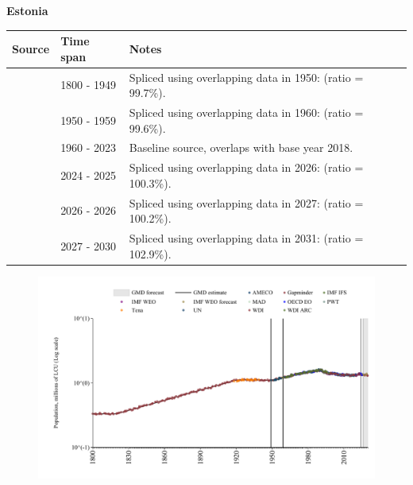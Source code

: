 \documentclass[12pt,a4paper,landscape]{article}
\begin{document}
\begin{adjustbox}{max totalsize={\paperwidth}{\paperheight},center}
\begin{minipage}[t][\textheight][t]{\textwidth}
\vspace*{0.5cm}
{}
\begin{center}
{\Large\bfseries Estonia}
\end{center}
\vspace{0.5cm}
\begin{table}[H]
\centering
\small
\begin{tabular}{|l|l|l|}
\hline
\textbf{Source} & \textbf{Time span} & \textbf{Notes} \\
\hline
\rowcolor{white}\cite{Gapminder}& 1800 - 1949 &Spliced using overlapping data in 1950: (ratio = 99.7\%).\\
\rowcolor{lightgray}\cite{IMF_IFS}& 1950 - 1959 &Spliced using overlapping data in 1960: (ratio = 99.6\%).\\
\rowcolor{white}\cite{WDI}& 1960 - 2023 &Baseline source, overlaps with base year 2018.\\
\rowcolor{lightgray}\cite{OECD_EO}& 2024 - 2025 &Spliced using overlapping data in 2026: (ratio = 100.3\%).\\
\rowcolor{white}\cite{AMECO}& 2026 - 2026 &Spliced using overlapping data in 2027: (ratio = 100.2\%).\\
\rowcolor{lightgray}\cite{Gapminder}& 2027 - 2030 &Spliced using overlapping data in 2031: (ratio = 102.9\%).\\
\hline
\end{tabular}
\end{table}
\begin{figure}[H]
\centering
\includegraphics[width=\textwidth,height=0.6\textheight,keepaspectratio]{graphs/EST_pop.pdf}
\end{figure}
\end{minipage}
\end{adjustbox}
\end{document}
